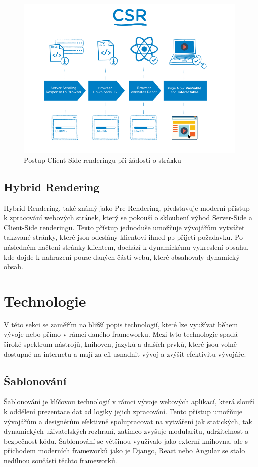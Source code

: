 \begin{figure}[H]
    \centering
    \includegraphics[width=1.0\textwidth]{figures/client-side-rendering}
    \caption{Postup Client-Side renderingu při žádosti o stránku \cite{rendering-diff}}
    \label{fig:client-side-rendering}
\end{figure}

\subsection{Hybrid Rendering}
\label{subsec:dev-request-processing-hybrid-rendering}
Hybrid Rendering, také známý jako Pre-Rendering, představuje moderní přístup k zpracování webových stránek, který se pokouší o skloubení výhod Server-Side a Client-Side renderingu. Tento přístup jednoduše umožňuje vývojářům vytvářet takzvané  stránky, které jsou odeslány klientovi ihned po přijetí požadavku. Po následném načtení stránky klientem, dochází k dynamickému vykreslení obsahu, kde dojde k nahrazení pouze daných části webu, které obsahovaly dynamický obsah.

\section{Technologie}
\label{sec:dev-technology}
V této sekci se zaměřím na bližší popis technologií, které lze využívat během vývoje nebo přímo v rámci daného frameworku. Mezi tyto technologie spadá široké spektrum nástrojů, knihoven, jazyků a dalších prvků, které jsou volně dostupné na internetu a mají za cíl usnadnit vývoj a zvýšit efektivitu vývojáře.

\subsection{Šablonování}
\label{subsec:dev-technology-templating}
Šablonování je klíčovou technologií v rámci vývoje webových aplikací, která slouží k oddělení prezentace dat od logiky jejich zpracování. Tento přístup umožňuje vývojářům a designérům efektivně spolupracovat na vytváření jak statických, tak dynamických uživatelských rozhraní, zatímco zvyšuje modularitu, udržitelnost a bezpečnost kódu. Šablonování se většinou využívalo jako externí knihovna, ale s příchodem moderních frameworků jako je Django, React nebo Angular se stalo nedílnou součástí těchto frameworků.


